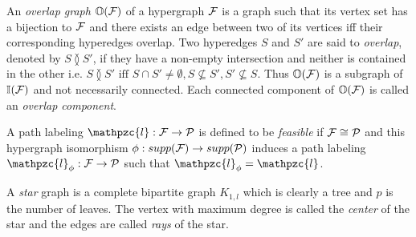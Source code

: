 \documentclass[11pt,letter]{../lib/llncs}
\def\cF{{\cal F}}
\def\cO{{\cal O}}
\def\cP{{\cal P}}
\def\F{{\mathcal F}}
\def\bI{\mathbb I}
\def\bO{\mathbb O}
\def\cl{\mathpzc{l}}
\def\overlap{\between}
\def\xnoindent{\noindent} %
\def\prelimspace{2mm}
\begin{document}


\xnoindent
An {\em overlap graph} $\bO(\cF)$ of a hypergraph $\cF$ is a graph
such that its vertex set has a bijection to $\cF$ and there exists an
edge between two of its vertices iff their corresponding hyperedges
overlap. Two hyperedges $S$ and $S'$ are said to {\em overlap},
denoted by $S \overlap S'$, if they have a non-empty intersection and
neither is contained in the other i.e. $S \overlap S' \text{ iff } S
\cap S' \ne \emptyset, S \nsubseteq S', S' \nsubseteq S$. Thus $\bO(\cF)$
is a subgraph of $\bI(\cF)$ and not necessarily connected. Each
connected component of $\bO(\cF)$ is called an {\em overlap
  component}.

 
\xnoindent
A path labeling $\cl: \cF \rightarrow \cP$ is defined to be {\em
  feasible} if
$\cF \cong \cP$ and this hypergraph isomorphism $\phi: supp(\cF)
\rightarrow supp(\cP)$ induces a path labeling $\cl_\phi: \cF
\rightarrow \cP$ such that $\cl_\phi = \cl$. 


\xnoindent A {\em star} graph is a complete bipartite graph $K_{1,l}$
which is clearly a tree and $p$ is the number of leaves. The vertex
with maximum degree is called the {\em center} of the star and the
edges are called {\em rays} of the star.
\end{document}
